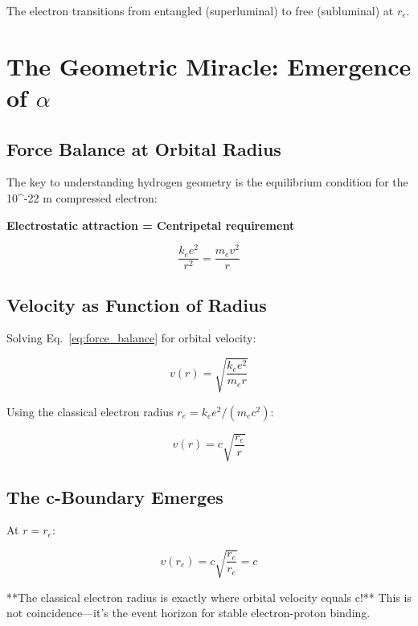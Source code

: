 The electron transitions from entangled (superluminal) to free (subluminal) at $r_e$.

\section{The Geometric Miracle: Emergence of $\alpha$}

\subsection{Force Balance at Orbital Radius}

The key to understanding hydrogen geometry is the equilibrium condition for the 10^{-22} m compressed electron:

\textbf{Electrostatic attraction = Centripetal requirement}

\begin{equation}
\frac{k_e e^2}{r^2} = \frac{m_e v^2}{r}
\label{eq:force_balance}
\end{equation}

\subsection{Velocity as Function of Radius}

Solving Eq.~\ref{eq:force_balance} for orbital velocity:

\begin{equation}
v(r) = \sqrt{\frac{k_e e^2}{m_e r}}
\end{equation}

Using the classical electron radius $r_e = k_e e^2/(m_e c^2)$:

\begin{equation}
v(r) = c\sqrt{\frac{r_e}{r}}
\label{eq:velocity_radius}
\end{equation}

\subsection{The c-Boundary Emerges}

At $r = r_e$:

\begin{equation}
v(r_e) = c\sqrt{\frac{r_e}{r_e}} = c
\end{equation}

**The classical electron radius is exactly where orbital velocity equals c!** This is not coincidence—it's the event horizon for stable electron-proton binding.

